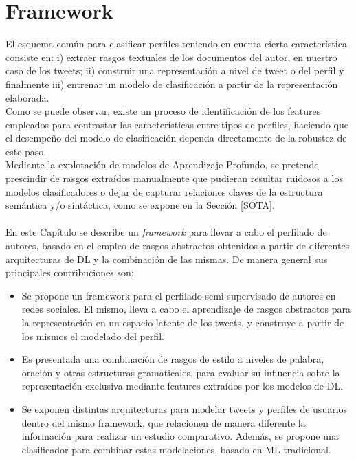 
\chapter{Framework}

	El esquema común para clasificar perfiles teniendo en cuenta cierta característica consiste en: i) extraer rasgos textuales de los documentos del autor, en nuestro caso de los tweets; ii) construir una representación a nivel de tweet o del perfil y finalmente iii) entrenar un modelo de clasificación a partir de la representación elaborada. 
	\\
	Como se puede observar, existe un proceso de identificación de los features empleados para contrastar las características entre tipos de perfiles, haciendo que el desempeño del modelo de clasificación dependa directamente de la robustez de este paso. 
	\\
	Mediante la explotación de modelos de Aprendizaje Profundo, se pretende prescindir de rasgos extraídos manualmente que pudieran resultar ruidosos a los modelos clasificadores o dejar de capturar relaciones claves de la estructura semántica y/o sintáctica, como se expone en la Sección \ref{SOTA}.
	\\\\
	En este Capítulo se describe un \textit{framework} para llevar a cabo el perfilado de autores, basado en el empleo de rasgos abstractos obtenidos a partir de diferentes arquitecturas de DL y la combinación de las mismas.
	De manera general sus principales contribuciones son:

	\begin{itemize}
			\item Se propone un framework para el perfilado semi-supervisado de autores en redes sociales. El mismo, lleva a cabo el aprendizaje de rasgos abstractos para la representación en un espacio latente de los tweets, y construye a partir de los mismos el modelado del perfil.
			
			\item Es presentada una combinación de rasgos de estilo a niveles de palabra, oración y otras estructuras gramaticales, para evaluar su influencia sobre la representación exclusiva mediante features extraídos por los modelos de DL. 
		
			\item  Se exponen distintas arquitecturas para modelar tweets y perfiles de usuarios dentro del mismo framework, que relacionen de manera diferente la información para realizar un estudio comparativo. Además, se propone una clasificador para combinar estas modelaciones, basado en ML tradicional.	
	\end{itemize}

